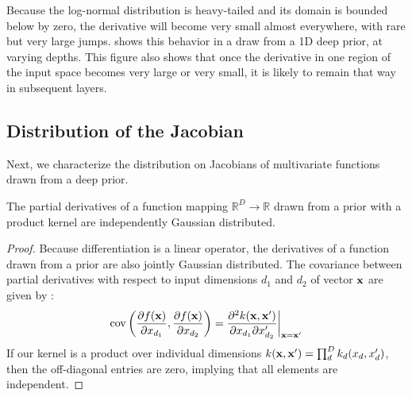 Because the log-normal distribution is heavy-tailed and its domain is bounded below by zero, the derivative will become very small almost everywhere, with rare but very large jumps.  
 shows this behavior in a draw from a 1D deep \gp{} prior, at varying depths.
This figure also shows that once the derivative in one region of the input space becomes very large or very small, it is likely to remain that way in subsequent layers.
%







\subsection{Distribution of the Jacobian}
\label{sec:theorem}

Next, we characterize the distribution on Jacobians of multivariate functions drawn from a deep \gp{} prior.

\begin{lemma}
\label{thm:deriv-ind}
The partial derivatives of a function mapping $\mathbb{R}^D \rightarrow \mathbb{R}$ drawn from a \gp{} prior with a product kernel are independently Gaussian distributed.
\end{lemma}
%
\begin{proof}
Because differentiation is a linear operator, the derivatives of a function drawn from a \gp{} prior are also jointly Gaussian distributed.
The covariance between partial derivatives with respect to input dimensions $d_1$ and $d_2$ of vector ${\bf{x}}$ are given by \citet{Solak03derivativeobservations}:
%
\begin{align}
\operatorname{cov} \left( \frac{\partial f({\bf{x}})}{\partial x_{d_1}}, \frac{\partial f({\bf{x}})}{\partial x_{d_2}} \right) 
= \frac{\partial^2 k({\bf{x}}, {\bf{x}}')}{\partial x_{d_1} \partial x_{d_2}'} \bigg|_{{\bf{x}}={\bf{x}}'}
\label{eq:deriv-kernel}
\end{align}
%
If our kernel is a product over individual dimensions $k({\bf{x}}, {\bf{x}}') = \prod_d^D k_d(x_d, x_d')$, 
then the off-diagonal entries are zero, implying that all elements are independent.
\end{proof}


